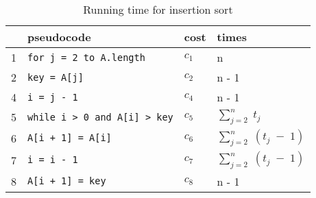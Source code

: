 \begin{center}
	\begin{table}[H]
		\centering
		\begin{tabular}{|l|l|l|l|}
			 \hline
			  & \textbf{pseudocode} & \textbf{cost}	& \textbf{times}					\\ \hline
			1 & \lstinline|for j = 2 to A.length| 					& $c_1$ 		& n 								\\
			2 & \quad\quad \lstinline|key = A[j]| 					& $c_2$ 		& n - 1 							\\
			4 & \quad\quad \lstinline|i = j - 1| 					& $c_4$ 		& n - 1 							\\
			5 & \quad\quad \lstinline|while i > 0 and A[i] > key|	& $c_5$ 		&  $\sum_{j=2}^{n}\;t_j$ 			\\
			6 & \quad\quad\quad\quad \lstinline|A[i + 1] = A[i]|	& $c_6$ 		&  $\sum_{j=2}^{n}\;(t_j\;-\;1)$ 	\\
			7 & \quad\quad\quad\quad \lstinline|i = i - 1| 			& $c_7$ 		&  $\sum_{j=2}^{n}\;(t_j\;-\;1)$ 	\\
			8 & \quad\quad \lstinline|A[i + 1] = key| 			& $c_8$ 		&  n - 1 	\\ \hline
		\end{tabular}
		\caption{Running time for insertion sort\cite[p.~18]{intro}}
		\label{tab:insertionCode}
	\end{table}
\end{center}